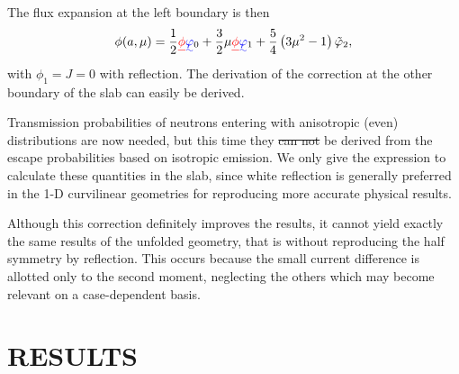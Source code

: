 \documentclass{ictt26}
\providecommand{\DIFadd}[1]{{\protect\color{blue}\uwave{#1}}} %
\providecommand{\DIFdel}[1]{{\protect\color{red}\sout{#1}}}                      %
\providecommand{\DIFaddbegin}{} %
\providecommand{\DIFaddend}{} %
\providecommand{\DIFdelbegin}{} %
\providecommand{\DIFdelend}{} %
\newcommand{\DIFscaledelfig}{0.5}
\newlength{\DIFdelgraphicswidth} %
\newlength{\DIFdelgraphicsheight} %
\newcommand{\DIFaddincludegraphics}[2][]{{\color{blue}\fbox{\DIFOincludegraphics[#1]{#2}}}} %
\newcommand{\DIFdelincludegraphics}[2][]{%
\sbox{\DIFdelgraphicsbox}{\DIFOincludegraphics[#1]{#2}}%
\settoboxwidth{\DIFdelgraphicswidth}{\DIFdelgraphicsbox} %
\settoboxtotalheight{\DIFdelgraphicsheight}{\DIFdelgraphicsbox} %
\scalebox{\DIFscaledelfig}{%
\parbox[b]{\DIFdelgraphicswidth}{\usebox{\DIFdelgraphicsbox}\\[-\baselineskip] \rule{\DIFdelgraphicswidth}{0em}}\llap{\resizebox{\DIFdelgraphicswidth}{\DIFdelgraphicsheight}{%
\setlength{\unitlength}{\DIFdelgraphicswidth}%
\begin{picture}(1,1)%
\thicklines\linethickness{2pt} %
{\color[rgb]{1,0,0}\put(0,0){\framebox(1,1){}}}%
{\color[rgb]{1,0,0}\put(0,0){\line( 1,1){1}}}%
{\color[rgb]{1,0,0}\put(0,1){\line(1,-1){1}}}%
\end{picture}%
}\hspace*{3pt}}} %
} %
\DeclareRobustCommand{\DIFaddbegin}{\DIFOaddbegin \let\includegraphics\DIFaddincludegraphics} %
\DeclareRobustCommand{\DIFaddend}{\DIFOaddend \let\includegraphics\DIFOincludegraphics} %
\DeclareRobustCommand{\DIFdelbegin}{\DIFOdelbegin \let\includegraphics\DIFdelincludegraphics} %
\DeclareRobustCommand{\DIFdelend}{\DIFOaddend \let\includegraphics\DIFOincludegraphics} %
\begin{document}
The flux expansion at the left boundary is then
\[ \phi(a, \mu) = \frac{1}{2} \DIFdelbegin \DIFdel{\phi}\DIFdelend \DIFaddbegin \DIFadd{\varphi}\DIFaddend _0 + \frac{3}{2} \mu \DIFdelbegin \DIFdel{\phi}\DIFdelend \DIFaddbegin \DIFadd{\varphi}\DIFaddend _1 + \frac{5}{4} \left( 3 \mu^2 - 1 \right) \DIFdelbegin %
\DIFdelend \DIFaddbegin \tilde{\varphi}\DIFaddend _2, \]
with \DIFdelbegin \DIFdel{$\phi_1 = J = 0$ }\DIFdelend \DIFaddbegin \DIFadd{$\varphi_1 = J = 0$ }\DIFaddend with reflection. The derivation of the correction at the other boundary of the slab can easily be derived.

Transmission probabilities of neutrons entering with anisotropic (even) distributions are now needed, but this time they \DIFdelbegin \DIFdel{can not }\DIFdelend \DIFaddbegin \DIFadd{cannot }\DIFaddend be derived from the escape probabilities based on isotropic emission. We only give the expression to calculate these quantities in the slab, since white reflection is generally preferred in the 1-D curvilinear geometries for reproducing more accurate physical results.

Although this correction definitely improves the results, it cannot yield exactly the same results of the unfolded geometry, that is without reproducing the half symmetry by reflection. This occurs because the small current difference is allotted only to the second moment, neglecting the others which may become relevant on a case-dependent basis.


\section{RESULTS}
\label{sec:res}
\end{document}
